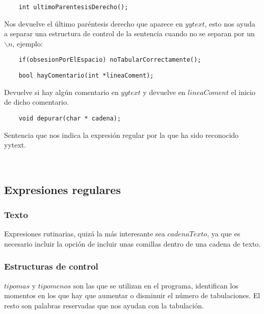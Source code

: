 \documentclass[11pt,spanish]{article} %
\begin{document}
\vspace{0.5cm}
\begin{lstlisting}
	int ultimoParentesisDerecho();
\end{lstlisting}
Nos devuelve el último paréntesis derecho que aparece en $yytext$, esto nos ayuda a separar una estructura de control de la sentencia cuando no se separan por un $\backslash n$, ejemplo: 
\begin{lstlisting}
	if(obsesionPorElEspacio) noTabularCorrectamente();
\end{lstlisting}


\vspace{0.5cm}
\begin{lstlisting}
	bool hayComentario(int *lineaComent);
\end{lstlisting}
Devuelve si hay algún comentario en $yytext$ y devuelve en $lineaComent$ el inicio de dicho comentario.\\


\vspace{0.5cm}
\begin{lstlisting}
	void depurar(char * cadena);
\end{lstlisting}
Sentencia que nos indica la expresión regular por la que ha sido reconocido yytext.

\


\subsection{Expresiones regulares}
\subsubsection{Texto}

Expresiones rutinarias, quizá la más interesante sea $cadenaTexto$, ya que es necesario incluir la opción de incluir unas comillas dentro de una cadena de texto.

\vspace{0.4cm}
\subsubsection{Estructuras de control}

$tipomas$ y $tipomenos$ son las que se utilizan en el programa, identifican los momentos en los que hay que aumentar o disminuir el número de tabulaciones.
El resto son palabras reservadas que nos ayudan con la tabulación.
\end{document}
